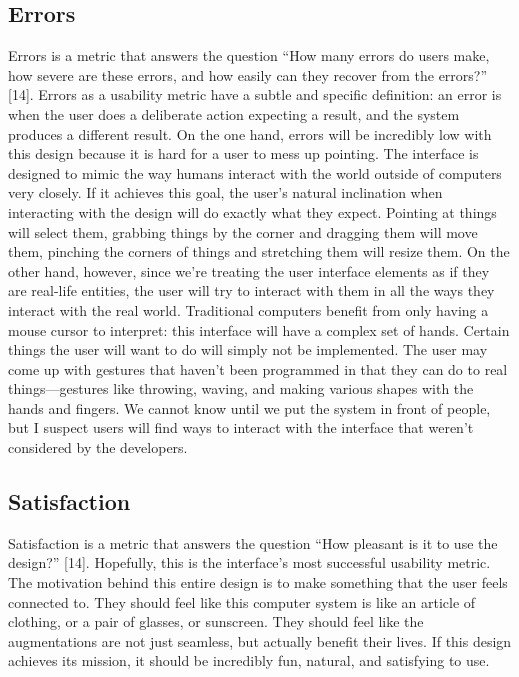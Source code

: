 \documentclass[a4paper,12pt]{article}
\begin{document}
\subsection{Errors}

Errors is a metric that answers the question ``How many errors do users make, how severe are these errors, and how easily can they recover from the errors?'' [14]. Errors as a usability metric have a subtle and specific definition: an error is when the user does a deliberate action expecting a result, and the system produces a different result. On the one hand, errors will be incredibly low with this design because it is hard for a user to mess up pointing. The interface is designed to mimic the way humans interact with the world outside of computers very closely. If it achieves this goal, the user's natural inclination when interacting with the design will do exactly what they expect. Pointing at things will select them, grabbing things by the corner and dragging them will move them, pinching the corners of things and stretching them will resize them. On the other hand, however, since we're treating the user interface elements as if they are real-life entities, the user will try to interact with them in all the ways they interact with the real world. Traditional computers benefit from only having a mouse cursor to interpret: this interface will have a complex set of hands. Certain things the user will want to do will simply not be implemented. The user may come up with gestures that haven't been programmed in that they can do to real things---gestures like throwing, waving, and making various shapes with the hands and fingers. We cannot know until we put the system in front of people, but I suspect users will find ways to interact with the interface that weren't considered by the developers.

\subsection{Satisfaction}

Satisfaction is a metric that answers the question ``How pleasant is it to use the design?'' [14]. Hopefully, this is the interface's most successful usability metric. The motivation behind this entire design is to make something that the user feels connected to. They should feel like this computer system is like an article of clothing, or a pair of glasses, or sunscreen. They should feel like the augmentations are not just seamless, but actually benefit their lives. If this design achieves its mission, it should be incredibly fun, natural, and satisfying to use.
\end{document}
